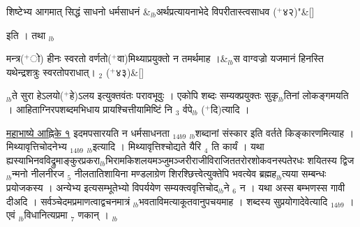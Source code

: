 \documentclass[article,12pt,a4paper]{memoir}%
\newcommand{\add}[1]{($^{+}$#1)}
\newcounter{parCount}
\begin{document}
	  
	  \pstart \leavevmode%
	\hphantom{.}
	    \pend%
	  
	    
	    \stanza[\smallbreak]
	  शिष्टेभ्य आगमात् सिद्धं साधनो धर्मसाधनं &{\tiny $_{lb}$}अर्थप्रत्यायनाभेदे विपरीतास्त्वसाधव \add{४२}{\normalfontlatin\large\qquad{}"}\&[\smallbreak]
	  
	  
	  
	    \pstart  \leavevmode%
	    \hphantom{.}
	   इति । तथा
	{}
	\pend%
      {\tiny $_{lb}$}
	  \bigskip
	  \begingroup
	

	  
	  \pstart \leavevmode%
	\hphantom{.}
	    \pend%
	  
	    
	    \stanza[\smallbreak]
	  मन्त्र\add{ो} हीनः स्वरतो वर्णतो\add{वा}मिथ्याप्रयुक्तो न तमर्थमाह ।&{\tiny $_{lb}$}स वाग्वज्रो यजमानं हिनस्ति यथेन्द्रशत्रुः स्वरतोपराधात्। {\tiny $_{2}$} \add{४३}\&[\smallbreak]
	  
	  
	  
	    \pstart  \leavevmode%
	    \hphantom{.}
	   {\tiny $_{lb}$}ते सुरा हेऽलयो\add{हे}ऽलय इत्युक्तवंतः परावभूवुः । एकोपि शब्दः सम्यक्प्रयुक्तः सुकृ{\tiny $_{lb}$}तिनां लोकङ्गमयति । आहिताग्निरपशब्दमभिधाय प्रायश्चित्तीयामिष्टिं नि {\tiny $_{3}$} र्वपे{\tiny $_{lb}$} \add{दि}त्यादि ।
	{}
	\pend%
      
	  \endgroup
	

	  
	  \pstart \leavevmode%
	\href{http://sarit.indology.info/?cref=MaBh\%C4\%81.1}{महाभाष्ये आह्निके १} इदमपसारयति {\color{DodgerBlue3}न धर्मसाधनता} {\tiny $_{14b9}$} {\tiny $_{lb}$}शब्दानां संस्कार इति वर्तते किङ्कारणमित्याह । {\color{DodgerBlue3}मिथ्यावृत्तिचोदनेभ्य} {\tiny $_{14b9}$} {\tiny $_{lb}$}इत्यादि । मिथ्यावृत्तिश्चोद्यते यैरि {\tiny $_{4}$} ति कार्यं । यथा ह्यस्याभिनवविद्रुमाङ्कुरप्रकरा{\tiny $_{lb}$}भिरामकिशलयमञ्जुमञ्जरीराजीविराजिततरोरशोकवनस्पतेरधः शयितस्य द्विज{\tiny $_{lb}$}न्मनो नीलनीरज {\tiny $_{5}$} नीलतातिशायिना मण्डलाग्रेण शिरश्छित्त्वेत्युक्तेपि भवत्येव ब्रह्मह{\tiny $_{lb}$}त्यया सम्बन्धः प्रयोजकस्य । अन्येभ्य इत्यसम्भूतेभ्यो विपर्ययेण सम्यक्त्ववृत्तिचोद{\tiny $_{lb}$}ने {\tiny $_{6}$} न । यथा अस्स बम्भणस्स गावी दीअदि । सर्वञ्चेदमप्रमाणत्वाद्वचनमात्रं {\tiny $_{lb}$}भवताविमत्याकूतवानुपचयमाह । {\color{DodgerBlue3}शब्दस्य सुप्रयोगादेवेत्यादि} {\tiny $_{14b9}$} । एवं {\tiny $_{lb}$}विधानित्यप्रमा {\tiny $_{7}$} णकान् ।
	{}
	\pend%
      {\tiny $_{lb}$}
\end{document}
